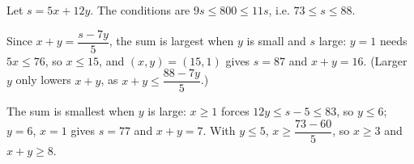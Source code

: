 Let $s=5x+12y$. The conditions are $9s\le800\le11s$, i.e. $73\le s\le88$.

Since $x+y=\dfrac{s-7y}5$, the sum is largest when $y$ is small and $s$ large: $y=1$ needs $5x\le76$, so $x\le15$, and $(x,y)=(15,1)$ gives $s=87$ and $x+y=\boxed{16}$. (Larger $y$ only lowers $x+y$, as $x+y\le\dfrac{88-7y}5$.)

The sum is smallest when $y$ is large: $x\ge1$ forces $12y\le s-5\le83$, so $y\le6$; $y=6$, $x=1$ gives $s=77$ and $x+y=\boxed{7}$. With $y\le5$, $x\ge\dfrac{73-60}5$, so $x\ge3$ and $x+y\ge8$.
